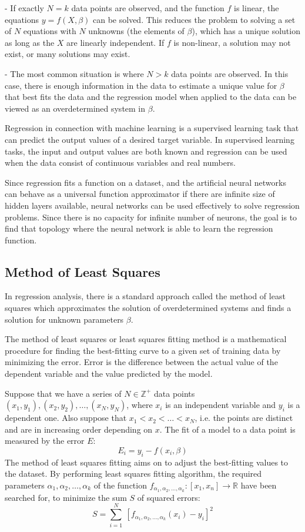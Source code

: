 \noindent- If exactly $N=k$ data points are observed, and the function $f$ is linear, the equations $y=f(X,\beta)$ can be solved. This reduces the problem to solving a set of $N$ equations with $N$ unknowns (the elements of $\beta$), which has a unique solution as long as the $X$ are linearly independent. If $f$ is non-linear, a solution may not exist, or many solutions may exist.\smallskip

\noindent- The most common situation is where $N>k$ data points are observed. In this case, there is enough information in the data to estimate a unique value for $\beta$ that best fits the data and the regression model when applied to the data can be viewed as an overdetermined system in $\beta$.\bigskip

Regression in connection with machine learning \cite{allen2007understanding} is a supervised learning task that can predict the output values of a desired target variable. In supervised learning tasks, the input and output values are both known and regression can be used when the data consist of continuous variables and real numbers.\smallskip

Since regression fits a function on a dataset, and the artificial neural networks can behave as a universal function approximator if there are infinite size of hidden layers available, neural networks can be used effectively to solve regression problems. Since there is no capacity for infinite number of neurons, the goal is to find that topology where the neural network is able to learn the regression function.


\subsection{Method of Least Squares}

In regression analysis, there is a standard approach called the method of least squares which approximates the solution of overdetermined systems and finds a solution for unknown parameters $\beta$.\medskip

The method of least squares or least squares fitting method \cite{wolberg2006data} is a mathematical procedure for finding the best-fitting curve to a given set of training data by minimizing the error. Error is the difference between the actual value of the dependent variable and the value predicted by the model. \medskip

Suppose that we have a series of $N\in\mathbb{Z}^+$ data points $(x_1, y_1), (x_2, y_2), \ldots, (x_N, y_N)$, where $x_i$ is an independent variable and $y_i$ is a dependent one. Also suppose that $x_1 < x_2 < \ldots < x_N$, i.e. the points are distinct and are in increasing order depending on $x$. The fit of a model to a data point is measured by the error $E$:
$$ E_i=y_i-f(x_i,\beta) $$
The method of least squares fitting aims on to adjust the best-fitting values to the dataset. By performing least squares fitting algorithm, the required parameters $\alpha_1, \alpha_2, \ldots, \alpha_k$ of the function $f_{\alpha_1, \alpha_2, \ldots, \alpha_k} : [x_1, x_n] \rightarrow \mathbb{R}$ have been searched for, to minimize the sum $S$ of squared errors:
$$ S=\sum_{i = 1}^N ~ [f_{\alpha_1, \alpha_2, \ldots, \alpha_k}(x_i) - y_i]^2 $$


